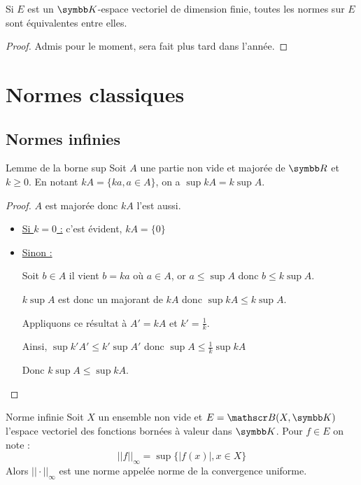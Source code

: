 \begin{theoreme}{}{}
    Si $E$ est un $\K$-espace vectoriel de dimension finie, toutes les normes 
    sur $E$ sont équivalentes entre elles.
\end{theoreme}

\begin{proof}
    Admis pour le moment, sera fait plus tard dans l'année.
\end{proof}

\section{Normes classiques}
\subsection{Normes infinies}

\begin{theoreme}{Lemme de la borne sup}{}
    Soit $A$ une partie non vide et majorée de $\R$ et $k \geqslant 0$. 
    En notant $kA = \{ka, a \in A \}$, on a $\sup kA = k \sup A$.
\end{theoreme}

\begin{proof}
    $A$ est majorée donc $kA$ l'est aussi. 

    \begin{itemize}
        \item \uline{Si $k = 0$ :} c'est évident, $kA = \{0\}$
        \item \uline{Sinon :}

        Soit $b \in A$ il vient $b = ka$ où $a \in A$, or $a \leqslant \sup A$ donc 
        $b \leqslant k \sup A$. 

        $k \sup A$ est donc un majorant de $k A$ donc $\sup k A \leqslant k \sup A$. 

        Appliquons ce résultat à $A' = kA$ et $k' = \frac 1 k$. 

        Ainsi, $\sup k' A' \leqslant k' \sup A'$ donc $\sup A \leqslant \frac 1 k \sup k A$

        Donc $k \sup A \leqslant \sup k A$. 
    \end{itemize}
\end{proof}

\begin{proposition}{Norme infinie}{}
    Soit $X$ un ensemble non vide et $E = \mathscr B(X, \K)$ l'espace vectoriel  des 
    fonctions bornées à valeur dans $\K$. 
    Pour $f \in E$ on note : 
    \[||f||_\infty = \sup \{|f(x)|, x \in X\}\]
    Alors $|| \cdot ||_\infty$ est une norme appelée norme de la convergence uniforme. 
\end{proposition}

